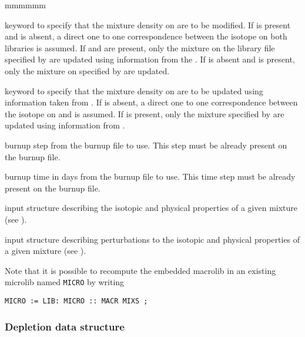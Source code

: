 \begin{ListeDeDescription}{mmmmmm}
\item[\moc{MAXS}] keyword to specify that the mixture density on 
are to be modified. If  is present and  is absent, a
direct one to one correspondence between the isotope on both libraries is
assumed. If  and  are present, only the
mixture on the library file specified by  are updated using
information from the . If  is absent and
 is present, only the mixture on   specified by
 are updated.

\item[\moc{BURN}] keyword to specify that the mixture density on 
are to be updated using information taken from . If 
is absent, a direct one to one correspondence between the isotope on
 and   is assumed. If   is present, only
the mixture specified by  are updated using information from
.

\item[\dusa{iburn}] burnup step from the burnup file to use. This step must be
already present on the burnup file.

\item[\dusa{tburn}] burnup time in days from the burnup file to use. This time
step must be already present on the burnup file.

\item[\dstr{descmix1}] input structure describing the
isotopic and physical properties of a given mixture (see ).

\item[\dstr{descmix2}] input structure describing perturbations to the
isotopic and physical properties of a given mixture (see ).


\end{ListeDeDescription}

Note that it is possible to recompute the embedded macrolib in an existing microlib
named {\tt MICRO} by writing
\begin{verbatim}
MICRO := LIB: MICRO :: MACR MIXS ;
\end{verbatim}

\clearpage

\subsubsection{Depletion data structure}\label{sect:descdepl}

